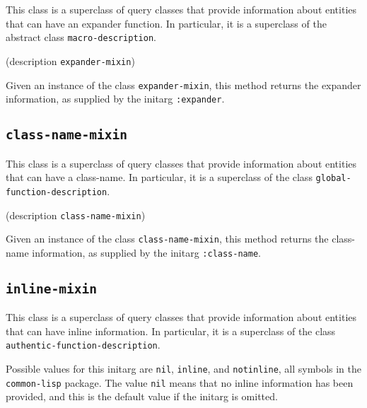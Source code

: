 {\footnotesize
{}
}

This class is a superclass of query classes that provide information
about entities that can have an expander function.  In particular, it is
a superclass of the abstract class \texttt{macro-description}.

{\footnotesize
{}
}

{\footnotesize
{} {(description {\tt expander-mixin})}
}

Given an instance of the class \texttt{expander-mixin}, this method
returns the expander information, as supplied by the initarg
\texttt{:expander}.

\subsection{\texttt{class-name-mixin}}
\label{sec-class-name-mixin}

{\footnotesize
{}
}

This class is a superclass of query classes that provide information
about entities that can have a class-name.  In particular, it is a
superclass of the class \texttt{global-function-description}.

{\footnotesize
{}
}

{\footnotesize
{} {(description {\tt class-name-mixin})}
}

Given an instance of the class \texttt{class-name-mixin}, this method
returns the class-name information, as supplied by the initarg
\texttt{:class-name}.

\subsection{\texttt{inline-mixin}}
\label{sec-inline-mixin}

{\footnotesize
{}
}

This class is a superclass of query classes that provide information
about entities that can have inline information.  In particular, it is a
superclass of the class \texttt{authentic-function-description}.

{\footnotesize
{}
}

Possible values for this initarg are \texttt{nil}, \texttt{inline},
and \texttt{notinline}, all symbols in the \texttt{common-lisp}
package.  The value \texttt{nil} means that no inline information has
been provided, and this is the default value if the initarg is omitted.

